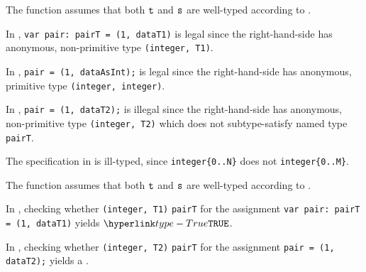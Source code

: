 



The function assumes that both $\texttt{t}$ and $\texttt{s}$ are well-typed according to .

In ,
\texttt{var pair: pairT = (1, dataT1)} is legal since the right-hand-side has
anonymous, non-primitive type \texttt{(integer, T1)}.

In ,
\texttt{pair = (1, dataAsInt);} is legal since the right-hand-side has anonymous,
primitive type \texttt{(integer, integer)}.

In ,
\texttt{pair = (1, dataT2);} is illegal since the right-hand-side has anonymous,
non-primitive type \texttt{(integer, T2)} which does not subtype-satisfy named
type \texttt{pairT}.

The specification in  is ill-typed,
since \verb|integer{0..N}| does not \typesatisfyterm{} \verb|integer{0..M}|.



The function assumes that both $\texttt{t}$ and $\texttt{s}$ are well-typed according to .

In ,
checking whether \verb|(integer, T1)| \typesatisfiesterm{} \verb|pairT|
for the assignment \verb|var pair: pairT = (1, dataT1)| yields $\True$.

In , checking whether \verb|(integer, T2)|
\typesatisfiesterm{} \verb|pairT| for the assignment \verb|pair = (1, dataT2);|
yields a \typingerrorterm.

